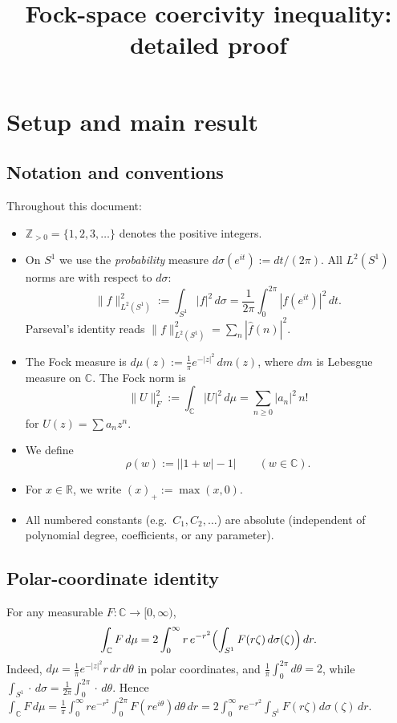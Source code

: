 \documentclass[11pt]{article}
\title{Fock-space coercivity inequality: detailed proof}
\author{}
\date{}
\newcommand{\rhof}{\rho}
\newcommand{\Zpos}{\mathbb{Z}_{>0}}
\newcommand{\norm}[1]{\lVert #1\rVert}
\begin{document}
\maketitle

\section{Setup and main result}

\subsection{Notation and conventions}
Throughout this document:
\begin{itemize}[nosep]
\item $\Zpos = \{1,2,3,\ldots\}$ denotes the positive integers.
\item On $S^1$ we use the \emph{probability} measure $d\sigma(e^{it}) := dt/(2\pi)$.
  All $L^2(S^1)$ norms are with respect to $d\sigma$:
  \[
    \norm{f}_{L^2(S^1)}^2 := \int_{S^1} |f|^2\,d\sigma
    = \frac{1}{2\pi}\int_0^{2\pi} |f(e^{it})|^2\,dt.
  \]
  Parseval's identity reads $\norm{f}_{L^2(S^1)}^2 = \sum_n |\hat f(n)|^2$.
\item The Fock measure is $d\mu(z) := \frac{1}{\pi}e^{-|z|^2}\,dm(z)$,
  where $dm$ is Lebesgue measure on $\mathbb{C}$.
  The Fock norm is
  \[
    \norm{U}_F^2 := \int_{\mathbb C}|U|^2\,d\mu = \sum_{n\ge 0}|a_n|^2\, n!
  \]
  for $U(z) = \sum a_n z^n$.
\item We define
  \[
    \rhof(w) := \bigl||1+w|-1\bigr| \qquad (w\in\mathbb{C}).
  \]
\item For $x \in \mathbb{R}$, we write $(x)_+ := \max(x,0)$.
\item All numbered constants (e.g.\ $C_1, C_2,\ldots$) are absolute (independent of
  polynomial degree, coefficients, or any parameter).
\end{itemize}

\subsection{Polar-coordinate identity}
For any measurable $F : \mathbb{C} \to [0,\infty)$,
\begin{equation}\label{eq:polar}
  \int_{\mathbb C} F\,d\mu
  = 2\int_0^\infty r\,e^{-r^2}\Bigl(\int_{S^1} F(r\zeta)\,d\sigma(\zeta)\Bigr)\,dr.
\end{equation}
Indeed, $d\mu = \frac{1}{\pi}e^{-|z|^2}r\,dr\,d\theta$ in polar coordinates,
and $\frac{1}{\pi}\int_0^{2\pi}d\theta = 2$,
while $\int_{S^1}\cdot\,d\sigma = \frac{1}{2\pi}\int_0^{2\pi}\cdot\,d\theta$.
Hence $\int_{\mathbb C}F\,d\mu = \frac{1}{\pi}\int_0^\infty re^{-r^2}\int_0^{2\pi}F(re^{i\theta})d\theta\,dr
= 2\int_0^\infty re^{-r^2}\int_{S^1}F(r\zeta)d\sigma(\zeta)\,dr$.
\end{document}
